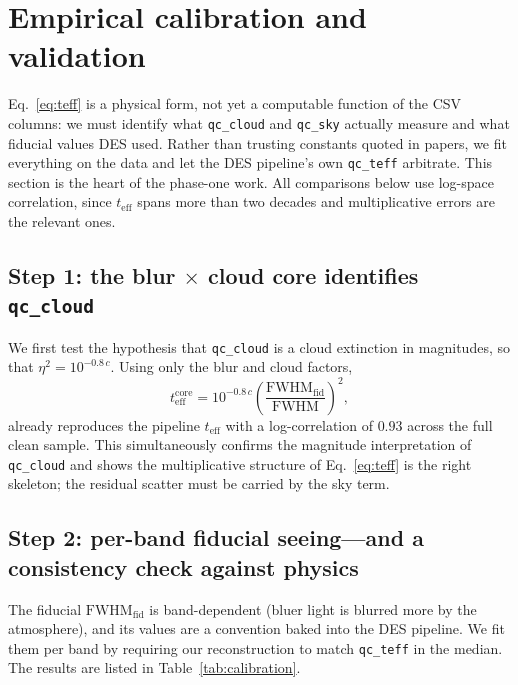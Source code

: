 \documentclass[11pt]{article}
\newcommand{\teff}{t_{\mathrm{eff}}}
\newcommand{\fwhm}{\mathrm{FWHM}}
\begin{document}
\section{Empirical calibration and validation}
\label{sec:calibration}

Eq.~\eqref{eq:teff} is a physical form, not yet a computable function of the CSV
columns: we must identify what \texttt{qc\_cloud} and \texttt{qc\_sky} actually
measure and what fiducial values DES used. Rather than trusting constants quoted in
papers, we fit everything on the data and let the DES pipeline's own
\texttt{qc\_teff} arbitrate. This section is the heart of the phase-one work. All
comparisons below use log-space correlation, since $\teff$ spans more than two
decades and multiplicative errors are the relevant ones.

\subsection{Step 1: the blur $\times$ cloud core identifies \texttt{qc\_cloud}}

We first test the hypothesis that \texttt{qc\_cloud} is a cloud extinction in
magnitudes, so that $\eta^2 = 10^{-0.8\,c}$. Using only the blur and cloud factors,
\begin{equation}
  \teff^{\mathrm{core}} = 10^{-0.8\,c}\left(\frac{\fwhm_{\mathrm{fid}}}{\fwhm}\right)^{2},
\end{equation}
already reproduces the pipeline $\teff$ with a log-correlation of $0.93$ across the
full clean sample. This simultaneously confirms the magnitude interpretation of
\texttt{qc\_cloud} and shows the multiplicative structure of Eq.~\eqref{eq:teff} is
the right skeleton; the residual scatter must be carried by the sky term.

\subsection{Step 2: per-band fiducial seeing---and a consistency check against physics}

The fiducial $\fwhm_{\mathrm{fid}}$ is band-dependent (bluer light is blurred more by
the atmosphere), and its values are a convention baked into the DES pipeline. We fit
them per band by requiring our reconstruction to match \texttt{qc\_teff} in the
median. The results are listed in Table~\ref{tab:calibration}.
\end{document}
